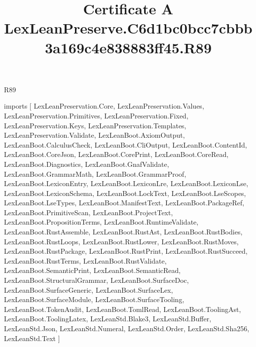 \begin{lexlean}{R89}
\title{Certificate A LexLeanPreserve.C6d1bc0bcc7cbbb3a169c4e838883ff45.R89}
\begin{coremodule}
imports [
  LexLeanPreservation.Core,
  LexLeanPreservation.Values,
  LexLeanPreservation.Primitives,
  LexLeanPreservation.Fixed,
  LexLeanPreservation.Keys,
  LexLeanPreservation.Templates,
  LexLeanPreservation.Validate,
  LexLeanBoot.AxiomOutput,
  LexLeanBoot.CalculusCheck,
  LexLeanBoot.CliOutput,
  LexLeanBoot.ContentId,
  LexLeanBoot.CoreJson,
  LexLeanBoot.CorePrint,
  LexLeanBoot.CoreRead,
  LexLeanBoot.Diagnostics,
  LexLeanBoot.GnafValidate,
  LexLeanBoot.GrammarMath,
  LexLeanBoot.GrammarProof,
  LexLeanBoot.LexiconEntry,
  LexLeanBoot.LexiconLre,
  LexLeanBoot.LexiconLse,
  LexLeanBoot.LexiconSchema,
  LexLeanBoot.LockText,
  LexLeanBoot.LseScopes,
  LexLeanBoot.LseTypes,
  LexLeanBoot.ManifestText,
  LexLeanBoot.PackageRef,
  LexLeanBoot.PrimitiveScan,
  LexLeanBoot.ProjectText,
  LexLeanBoot.PropositionTerms,
  LexLeanBoot.RuntimeValidate,
  LexLeanBoot.RustAssemble,
  LexLeanBoot.RustAst,
  LexLeanBoot.RustBodies,
  LexLeanBoot.RustLoops,
  LexLeanBoot.RustLower,
  LexLeanBoot.RustMoves,
  LexLeanBoot.RustPackage,
  LexLeanBoot.RustPrint,
  LexLeanBoot.RustSucceed,
  LexLeanBoot.RustTerms,
  LexLeanBoot.RustValidate,
  LexLeanBoot.SemanticPrint,
  LexLeanBoot.SemanticRead,
  LexLeanBoot.StructuralGrammar,
  LexLeanBoot.SurfaceDoc,
  LexLeanBoot.SurfaceGeneric,
  LexLeanBoot.SurfaceLex,
  LexLeanBoot.SurfaceModule,
  LexLeanBoot.SurfaceTooling,
  LexLeanBoot.TokenAudit,
  LexLeanBoot.TomlRead,
  LexLeanBoot.ToolingAst,
  LexLeanBoot.ToolingLatex,
  LexLeanStd.Blake3,
  LexLeanStd.Buffer,
  LexLeanStd.Json,
  LexLeanStd.Numeral,
  LexLeanStd.Order,
  LexLeanStd.Sha256,
  LexLeanStd.Text
]


\end{coremodule}
\end{lexlean}
